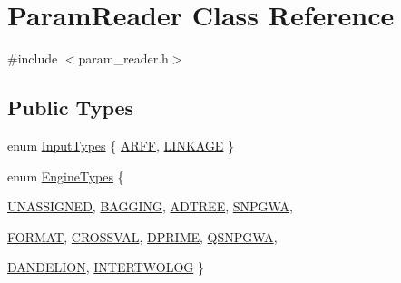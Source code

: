 \hypertarget{classParamReader}{
\section{ParamReader Class Reference}
\label{classParamReader}
}


{\ttfamily \#include $<$param\_\-reader.h$>$}

\subsection*{Public Types}
\begin{DoxyCompactItemize}
\item 
enum \hyperlink{classParamReader_a5954b9845fceb081c5e259dfc7118238}{InputTypes} \{ \hyperlink{classParamReader_a5954b9845fceb081c5e259dfc7118238a7375bfa42146fea4290360622fc5345e}{ARFF}, 
\hyperlink{classParamReader_a5954b9845fceb081c5e259dfc7118238ad72ac83343e74998040fdebd70c05284}{LINKAGE}
 \}
\item 
enum \hyperlink{classParamReader_ade771142042ad0251f905f38248ae9df}{EngineTypes} \{ \par
\hyperlink{classParamReader_ade771142042ad0251f905f38248ae9dfa4f93cf77f6a672cb915b25005ad3842e}{UNASSIGNED}, 
\hyperlink{classParamReader_ade771142042ad0251f905f38248ae9dfa9413313d32f2792b15708e6768f1f80b}{BAGGING}, 
\hyperlink{classParamReader_ade771142042ad0251f905f38248ae9dfa21e66dd9f5fceffaa9c7e22e1fbd8a65}{ADTREE}, 
\hyperlink{classParamReader_ade771142042ad0251f905f38248ae9dfa0a2f7bd0340be5eb2db7727af93a035b}{SNPGWA}, 
\par
\hyperlink{classParamReader_ade771142042ad0251f905f38248ae9dfa87d48919f03f8f6e437af98d73ce0554}{FORMAT}, 
\hyperlink{classParamReader_ade771142042ad0251f905f38248ae9dfad44bbb13488be83b446edf2f1698400d}{CROSSVAL}, 
\hyperlink{classParamReader_ade771142042ad0251f905f38248ae9dfa6f24418bf4d9982f3e02a4bf9aa43698}{DPRIME}, 
\hyperlink{classParamReader_ade771142042ad0251f905f38248ae9dfa261db4ce98a8183ce7d42feae1ca097d}{QSNPGWA}, 
\par
\hyperlink{classParamReader_ade771142042ad0251f905f38248ae9dfa4c66f07e11e6044f872c6971243ee714}{DANDELION}, 
\hyperlink{classParamReader_ade771142042ad0251f905f38248ae9dfacc516636ab57343817a97a8e822a4f62}{INTERTWOLOG}
 \}
\end{DoxyCompactItemize}
